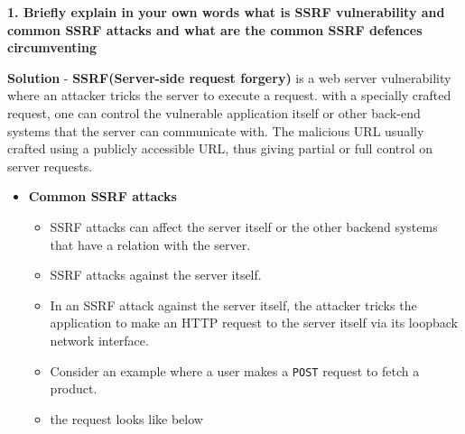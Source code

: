 \textbf{1. Briefly explain in your own words what is SSRF vulnerability
and common SSRF attacks and what are the common SSRF defences
circumventing}

\textbf{Solution} - \textbf{SSRF(Server-side request forgery)} is a web
server vulnerability where an attacker tricks the server to execute a
request. with a specially crafted request, one can control the
vulnerable application itself or other back-end systems that the server
can communicate with. The malicious URL usually crafted using a publicly
accessible URL, thus giving partial or full control on server requests.

\begin{itemize}
\item
  \textbf{Common SSRF attacks}

  \begin{itemize}
  \tightlist
  \item
    SSRF attacks can affect the server itself or the other backend
    systems that have a relation with the server.
  \item
    SSRF attacks against the server itself.
  \item
    In an SSRF attack against the server itself, the attacker tricks the
    application to make an HTTP request to the server itself via its
    loopback network interface.
  \item
    Consider an example where a user makes a \texttt{POST} request to
    fetch a product.
  \item
    the request looks like below
  \end{itemize}

\begin{Shaded}
\begin{Highlighting}[]


\end{Highlighting}
\end{Shaded}
\end{itemize}
